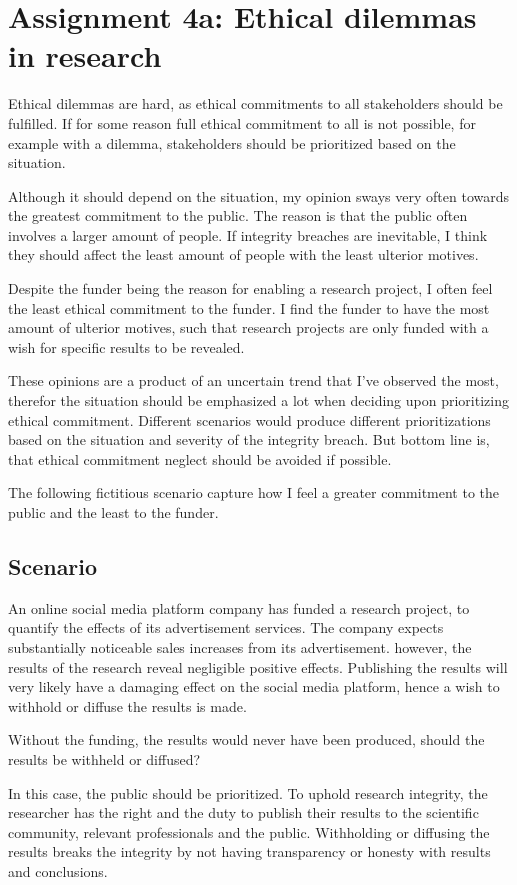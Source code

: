 \section*{Assignment 4a: Ethical dilemmas in research}
Ethical dilemmas are hard, as ethical commitments to all stakeholders should be fulfilled.
If for some reason full ethical commitment to all is not possible, for example with a dilemma, stakeholders should be prioritized based on the situation.

Although it should depend on the situation, my opinion sways very often towards the greatest commitment to the public. 
The reason is that the public often involves a larger amount of people. If integrity breaches are inevitable, I think they should affect the least amount of people with the least ulterior motives.

Despite the funder being the reason for enabling a research project, I often feel the least ethical commitment to the funder.
I find the funder to have the most amount of ulterior motives, such that research projects are only funded with a wish for specific results to be revealed.

These opinions are a product of an uncertain trend that I've observed the most, therefor the situation should be emphasized a lot when deciding upon prioritizing ethical commitment.
Different scenarios would produce different prioritizations based on the situation and severity of the integrity breach. 
But bottom line is, that ethical commitment neglect should be avoided if possible.

The following fictitious scenario capture how I feel a greater commitment to the public and the least to the funder.  

\subsection*{Scenario}
An online social media platform company has funded a research project, to quantify the effects of its advertisement services. 
The company expects substantially noticeable sales increases from its advertisement. however, the results of the research reveal negligible positive effects.
Publishing the results will very likely have a damaging effect on the social media platform, hence a wish to withhold or diffuse the results is made.

Without the funding, the results would never have been produced, should the results be withheld or diffused?

In this case, the public should be prioritized. To uphold research integrity, the researcher has the right and the duty to publish their results to the scientific community, relevant professionals and the public.
Withholding or diffusing the results breaks the integrity by not having transparency or honesty with results and conclusions.

\newpage